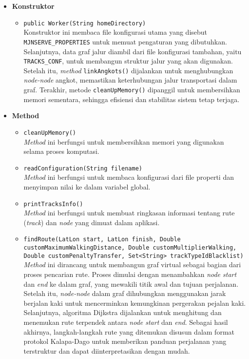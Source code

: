 \begin{itemize}
    \item \textbf{Konstruktor}
    \begin{itemize}
        \item \texttt{public Worker(String homeDirectory)}
        \\ Konstruktor ini membaca file konfigurasi utama yang disebut \texttt{MJNSERVE\_PROPERTIES} untuk memuat pengaturan yang dibutuhkan. Selanjutnya, data graf jalur diambil dari file konfigurasi tambahan, yaitu \texttt{TRACKS\_CONF}, untuk membangun struktur jalur yang akan digunakan. Setelah itu, \textit{method} \texttt{linkAngkots()} dijalankan untuk menghubungkan \textit{node-node} angkot, memastikan keterhubungan jalur transportasi dalam graf. Terakhir, metode \texttt{cleanUpMemory()} dipanggil untuk membersihkan memori sementara, sehingga efisiensi dan stabilitas sistem tetap terjaga.
    \end{itemize}
\newpage
    \item \textbf{Method}
    \begin{itemize}
        \item \texttt{cleanUpMemory()}
        \\ \textit{Method} ini berfungsi untuk membersihkan memori yang digunakan selama proses komputasi.
        \item \texttt{readConfiguration(String filename)}
        \\ \textit{Method} ini berfungsi untuk membaca konfigurasi dari file properti dan menyimpan nilai ke dalam variabel global.
        \item \texttt{printTracksInfo()}
        \\ \textit{Method} ini berfungsi untuk membuat ringkasan informasi tentang rute (\textit{track}) dan \textit{node} yang dimuat dalam aplikasi.
        \item \texttt{findRoute(LatLon start, LatLon finish, Double customMaximumWalkingDistance, Double customMultiplierWalking, Double customPenaltyTransfer, Set<String> trackTypeIdBlacklist)}
        \\ \textit{Method} ini dirancang untuk membangun graf virtual sebagai bagian dari proses pencarian rute. Proses dimulai dengan menambahkan \textit{node start} dan \textit{end} ke dalam graf, yang mewakili titik awal dan tujuan perjalanan. Setelah itu, \textit{node-node} dalam graf dihubungkan menggunakan jarak berjalan kaki untuk mencerminkan kemungkinan pergerakan pejalan kaki. Selanjutnya, algoritma Dijkstra dijalankan untuk menghitung dan menemukan rute terpendek antara \textit{node start} dan \textit{end}. Sebagai hasil akhirnya, langkah-langkah rute yang ditemukan disusun dalam format protokol Kalapa-Dago untuk memberikan panduan perjalanan yang terstruktur dan dapat diinterpretasikan dengan mudah.

\end{itemize}
\end{itemize}
